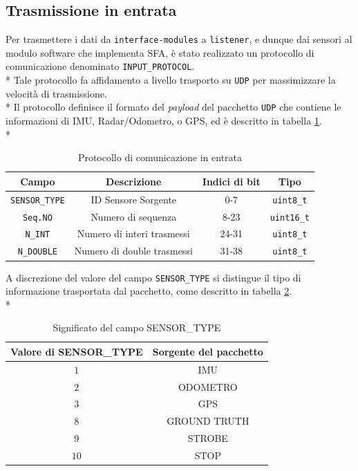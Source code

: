 \subsection{Trasmissione in entrata}
Per trasmettere i dati da \texttt{interface-modules} a \texttt{listener}, e dunque dai sensori al modulo software che implementa SFA, \`e stato realizzato un protocollo di comunicazione denominato \texttt{INPUT\_PROTOCOL}.\\*
Tale protocollo fa affidamento a livello trasporto su \texttt{UDP} per massimizzare la velocit\`a di trasmissione.\\*
Il protocollo definisce il formato del \emph{payload} del pacchetto \texttt{UDP} che contiene le informazioni di IMU, Radar/Odometro, o GPS, ed \`e descritto in tabella \ref{tab:protoin}.\\*
\begin{table}[h]
			\centering
\begin{tabular}{|c|c|c|c|}
	\hline 
	\textbf{Campo} & \textbf{Descrizione} & \textbf{Indici di bit} & \textbf{Tipo} \\ 
	\hline 
	\texttt{SENSOR\_TYPE} & ID Sensore Sorgente & 0-7 & \texttt{uint8\_t} \\ 
	\hline 
	\texttt{Seq.NO} & Numero di sequenza & 8-23 & \texttt{uint16\_t} \\ 
	\hline 
	\texttt{N\_INT} & Numero di interi trasmessi & 24-31 & \texttt{uint8\_t} \\ 
	\hline 
	\texttt{N\_DOUBLE} & Numero di double trasmessi & 31-38 & \texttt{uint8\_t} \\ 
	\hline 
\end{tabular} 
\caption{Protocollo di comunicazione in entrata}
\label{tab:protoin}
\end{table}
A discrezione del valore del campo \texttt{SENSOR\_TYPE} si distingue il tipo di informazione trasportata dal pacchetto, come descritto in tabella \ref{tab:sensors}.\\*
\begin{table}[h]
		\centering
	\begin{tabular}{|c|c|}
		\hline 
		\textbf{Valore di SENSOR\_TYPE} & \textbf{Sorgente del pacchetto} \\ 
		\hline 
		$1$ & IMU \\ 
		\hline 
		$2$ & ODOMETRO \\ 
		\hline 
		$3$ & GPS \\ 
		\hline 
		$8$ & GROUND TRUTH \\ 
		\hline 
		$9$ & STROBE \\ 
		\hline 
		$10$ & STOP \\ 
		\hline 
	\end{tabular} 
	\caption{Significato del campo SENSOR\_TYPE}
	\label{tab:sensors}
\end{table}
